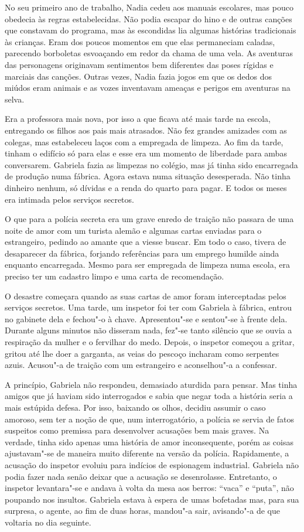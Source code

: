 No seu primeiro ano de trabalho, Nadia cedeu aos manuais escolares, mas
pouco obedecia às regras estabelecidas. Não podia escapar do hino e de
outras canções que constavam do programa, mas às escondidas lia algumas histórias tradicionais às crianças. Eram dos poucos momentos em que
elas permaneciam caladas, parecendo borboletas esvoaçando em redor da
chama de uma vela. As aventuras das personagens originavam sentimentos
bem diferentes das poses rígidas e marciais das canções. Outras vezes,
Nadia fazia jogos em que os dedos dos miúdos eram animais e as vozes
inventavam ameaças e perigos em aventuras na selva.

Era a professora mais nova, por isso a que ficava até mais tarde na
escola, entregando os filhos aos pais mais atrasados. Não fez grandes
amizades com as colegas, mas estabeleceu laços com a empregada de
limpeza. Ao fim da tarde, tinham o edifício só para elas e esse era um
momento de liberdade para ambas conversarem. Gabriela fazia as limpezas
no colégio, mas já tinha sido encarregada de produção numa fábrica.
Agora estava numa
situação desesperada. Não tinha dinheiro nenhum, só dívidas e a renda do
quarto para pagar. E todos os meses era intimada pelos serviços
secretos.

O que para a polícia secreta era um grave enredo de traição não passara
de uma noite de amor com um turista alemão e algumas cartas enviadas
para o estrangeiro, pedindo ao amante que a viesse buscar. Em todo o
caso, tivera de desaparecer da fábrica, forjando referências para um
emprego humilde ainda enquanto encarregada. Mesmo para ser empregada de
limpeza numa escola, era preciso ter um cadastro limpo e uma carta de
recomendação.

O desastre começara quando as suas cartas de amor foram interceptadas
pelos serviços secretos. Uma tarde, um inspetor foi ter com Gabriela à
fábrica, entrou no gabinete dela e fechou"-o à chave. Apresentou"-se e
sentou"-se à frente dela. Durante alguns minutos não disseram nada, fez"-se
tanto silêncio que se ouvia a respiração da mulher e o fervilhar do
medo. Depois, o inspetor começou a gritar, gritou até lhe doer a
garganta, as veias do pescoço incharam como serpentes azuis. Acusou"-a de
traição com um estrangeiro e aconselhou"-a a confessar.

A princípio,
Gabriela não respondeu, demasiado aturdida para pensar. Mas tinha
amigos que já haviam sido interrogados e sabia que negar toda a história
seria a mais estúpida defesa. Por isso, baixando os olhos, decidiu assumir o caso amoroso, sem ter a noção de que, num interrogatório, a
polícia se servia de fatos suspeitos como premissa para desenvolver
acusações bem mais graves. Na verdade, tinha sido apenas uma história de
amor inconsequente, porém as coisas ajustavam"-se de maneira muito
diferente na
versão da polícia. Rapidamente, a acusação do inspetor evoluiu para
indícios de espionagem industrial. Gabriela não podia fazer nada senão
deixar que a acusação se desenrolasse. Entretanto, o inspetor
levantara"-se e andava à volta da mesa aos berros: ``vaca'' e ``puta'', não
poupando nos insultos. Gabriela estava à espera de umas bofetadas mas,
para sua surpresa, o agente, ao fim de duas horas, mandou"-a sair,
avisando"-a de que voltaria no dia seguinte.


